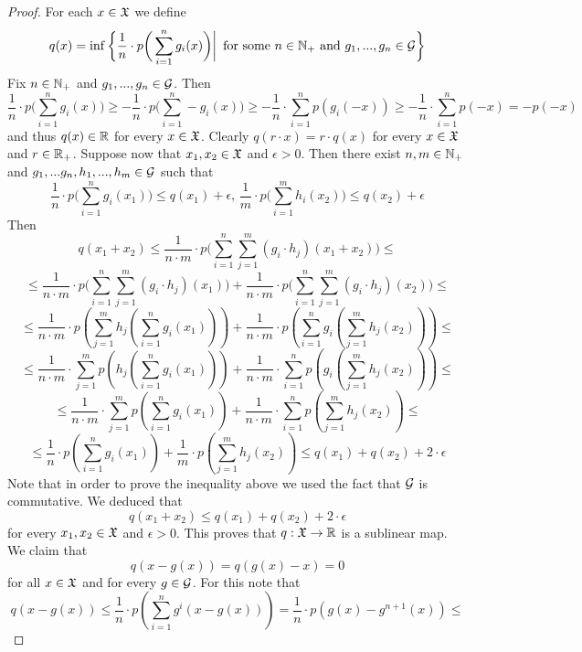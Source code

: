 \begin{proof}
   For each $x \in {\mathfrak X}$ we define
   $$q(x) = \inf \bigg\{\frac{1}{n}\cdot p\bigg(\sum_{i=1}^ng_i(x)\bigg)\bigg|\,\mbox{ for some }n\in {\mathbb N}_+\mbox{ and }g_1,...,g_n\in {\mathcal G}\bigg\}$$
   Fix $n\in {\mathbb N}_+$ and $g_1,...,g_n\in {\mathcal G}$. Then
   $$\frac{1}{n}\cdot p\bigg(\sum_{i=1}^ng_i(x)\bigg)\geq -\frac{1}{n}\cdot p\bigg(\sum_{i=1}^n-g_i(x)\bigg) \geq -\frac{1}{n}\cdot \sum_{i=1}^np\left(g_i(-x)\right) \geq -\frac{1}{n}\cdot \sum_{i=1}^np\left(-x\right) = -p(-x)$$
   and thus $q(x) \in {\mathbb R}$ for every $x\in {\mathfrak X}$. Clearly $q(r\cdot x) = r\cdot q(x)$ for every $x\in {\mathfrak X}$ and $r\in {\mathbb R}_+$. Suppose now that $x_1,x_2\in {\mathfrak X}$ and $\epsilon > 0$. Then there exist $n,m \in {\mathbb N}_+$ and $g_1,...g_n,h_1,...,h_m \in {\mathcal G}$ such that
   $$\frac{1}{n}\cdot p\bigg(\sum_{i=1}^ng_i(x_1)\bigg) \leq q(x_1) + \epsilon,\,\frac{1}{m}\cdot p\bigg(\sum_{i=1}^m h_i(x_2)\bigg) \leq q(x_2) + \epsilon$$
   Then
   $$q(x_1 + x_2) \leq \frac{1}{n\cdot m}\cdot p\bigg(\sum_{i=1}^n\sum_{j=1}^m\left(g_i\cdot h_j\right)(x_1 + x_2)\bigg) \leq$$
   $$\leq \frac{1}{n\cdot m}\cdot p\bigg(\sum_{i=1}^n\sum_{j=1}^m \left(g_i\cdot h_j\right)(x_1)\bigg) + \frac{1}{n\cdot m}\cdot p\bigg(\sum_{i=1}^n\sum_{j=1}^m\left(g_i\cdot h_j\right)(x_2)\bigg) \leq$$
   $$\leq \frac{1}{n\cdot m}\cdot p\left(\sum_{j=1}^m h_j\left(\sum_{i=1}^n g_i\left(x_1\right)\right)\right) + \frac{1}{n\cdot m}\cdot p\left(\sum_{i=1}^n g_i\left(\sum_{j=1}^m h_j\left(x_2\right)\right)\right) \leq $$
   $$\leq \frac{1}{n\cdot m}\cdot \sum_{j=1}^m p\left(h_j\left(\sum_{i=1}^n g_i\left(x_1\right)\right)\right) + \frac{1}{n\cdot m}\cdot \sum_{i=1}^n p\left(g_i\left(\sum_{j=1}^m h_j\left(x_2\right)\right)\right) \leq $$
   $$\leq \frac{1}{n\cdot m}\cdot \sum_{j=1}^m p\left(\sum_{i=1}^n g_i\left(x_1\right)\right) + \frac{1}{n\cdot m}\cdot \sum_{i=1}^n p\left(\sum_{j=1}^m h_j\left(x_2\right)\right) \leq $$
   $$\leq  \frac{1}{n}\cdot p\left(\sum_{i=1}^n g_i\left(x_1\right)\right) + \frac{1}{m}\cdot p\left(\sum_{j=1}^m h_j\left(x_2\right)\right) \leq q(x_1) + q(x_2) + 2\cdot \epsilon$$
   Note that in order to prove the inequality above we used the fact that ${\mathcal G}$ is commutative. We deduced that
   $$q(x_1 + x_2) \leq q(x_1) + q(x_2) + 2\cdot \epsilon$$
   for every $x_1,x_2\in {\mathfrak X}$ and $\epsilon > 0$. This proves that $q:{\mathfrak X} \rightarrow {\mathbb R}$ is a sublinear map. We claim that
   $$q\left(x - g(x)\right) = q\left(g(x) - x\right) = 0$$
   for all $x\in {\mathfrak X}$ and for every $g\in {\mathcal G}$. For this note that
   $$q\left(x - g(x)\right) \leq \frac{1}{n}\cdot p\left(\sum_{i=1}^ng^i\left(x - g(x)\right)\right) = \frac{1}{n}\cdot p\left(g(x) - g^{n+1}(x)\right) \leq$$

\end{proof}
